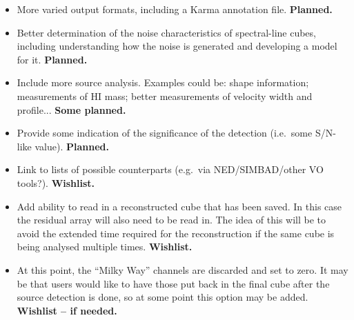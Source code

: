 \documentclass[12pt]{article}
\newcommand{\eg}{e.g.\ }
\newcommand{\ie}{i.e.\ }
\begin{document}
\begin{itemize}

\item More varied output formats, including a Karma annotation file. {\bf Planned.}

\item Better determination of the noise characteristics of
  spectral-line cubes, including understanding how the noise is
  generated and developing a model for it. {\bf Planned.}
  
\item Include more source analysis. Examples could be: shape
  information; measurements of HI mass; better measurements of
  velocity width and profile... {\bf Some planned.}

\item Provide some indication of the significance of the detection
  (\ie some S/N-like value). {\bf Planned.}

\item Link to lists of possible counterparts (\eg via NED/SIMBAD/other
  VO tools?). {\bf Wishlist.} 

\item Add ability to read in a reconstructed cube that has been
  saved. In this case the residual array will also need to be read
  in. The idea of this will be to avoid the extended time required for
  the reconstruction if the same cube is being analysed multiple
  times. {\bf Wishlist.}
 
\item At this point, the ``Milky Way'' channels are discarded and set
  to zero. It may be that users would like to have those put back in
  the final cube after the source detection is done, so at some point
  this option may be added. {\bf Wishlist -- if needed.}

\end{itemize}
\end{document}
